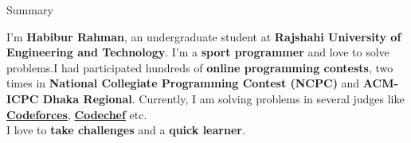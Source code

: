 \documentclass[letterpaper,11pt,oneside]{article}
\begin{document}
\vspace{-3ex}
\begin{flushleft}
\Large{Summary}
\end{flushleft}
\vspace{-1.85ex}
\begin{multicols}{2}
\justify
I'm \textbf{Habibur Rahman}, an undergraduate student at \textbf{Rajshahi University of Engineering and Technology}. I'm a \textbf{sport programmer} and love to solve problems.I had participated hundreds of \textbf{online programming contests}, two times in \textbf{National Collegiate Programming Contest (NCPC)} and \textbf{ACM-ICPC Dhaka Regional}. Currently, I am solving problems in several judges like \href{http://codeforces.com/profile/habib_rahman}{\textbf{Codeforces}}, \href{https://www.codechef.com/users/habib_ruet}{\textbf{Codechef}} etc.\\
I love to \textbf{take challenges} and a \textbf{quick learner}.
\end{multicols}
\vspace{1ex}
\end{document}
